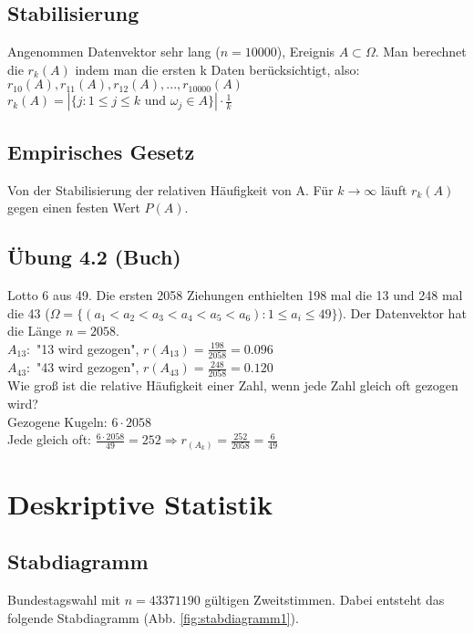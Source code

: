 \subsection{Stabilisierung}
Angenommen Datenvektor sehr lang ($ n = 10 000 $), Ereignis $A \subset \Omega $. Man berechnet die $ r_k(A) $ indem man die ersten k Daten berücksichtigt, also: $ r_{10}(A), r_{11}(A), r_{12}(A), ..., r_{10 000}(A) $ \\
$ r_k(A) = | \{ j : 1\leq j \leq k \textrm{ und } \omega_j \in A \} | \cdot \frac{1}{k} $


\subsection{Empirisches Gesetz}
Von der Stabilisierung der relativen Häufigkeit von A. Für $ k\rightarrow \infty $ läuft $r_k(A) $ gegen einen festen Wert $ P(A) $.

\subsection{Übung 4.2 (Buch)} Lotto 6 aus 49.
Die ersten 2058 Ziehungen enthielten 198 mal die 13 und 248 mal die 43 ($ \Omega=\{(a_1 < a_2 < a_3 < a_4 < a_5 < a_6) : 1\leq a_i\leq 49 \} $). Der Datenvektor hat die Länge $ n = 2058 $. \\
$ A_{13}: $ "13 wird gezogen", $ r(A_{13}) = \frac{198}{2058} = 0.096 $\\
$ A_{43}: $ "43 wird gezogen", $ r(A_{43}) = \frac{248}{2058} = 0.120 $\\
Wie groß ist die relative Häufigkeit einer Zahl, wenn jede Zahl gleich oft gezogen wird?\\
Gezogene Kugeln: $ 6 \cdot 2058 $\\
Jede gleich oft: $ \frac{6\cdot 2058}{49}=252 \Rightarrow r_(A_k)=\frac{252}{2058}=\frac{6}{49} $

\section{Deskriptive Statistik}

\subsection{Stabdiagramm}
Bundestagswahl mit $ n = 43 371 190 $ gültigen Zweitstimmen. Dabei entsteht das folgende Stabdiagramm (Abb. \ref{fig:stabdiagramm1}).

